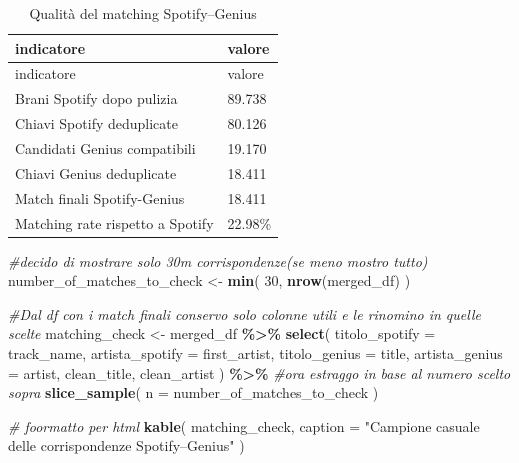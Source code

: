 \documentclass[
]{article}
\newenvironment{Shaded}{\begin{snugshade}}{\end{snugshade}}
\newcommand{\AttributeTok}[1]{\textcolor[rgb]{0.13,0.29,0.53}{#1}}
\newcommand{\CommentTok}[1]{\textcolor[rgb]{0.56,0.35,0.01}{\textit{#1}}}
\newcommand{\DecValTok}[1]{\textcolor[rgb]{0.00,0.00,0.81}{#1}}
\newcommand{\FunctionTok}[1]{\textcolor[rgb]{0.13,0.29,0.53}{\textbf{#1}}}
\newcommand{\NormalTok}[1]{#1}
\newcommand{\OtherTok}[1]{\textcolor[rgb]{0.56,0.35,0.01}{#1}}
\newcommand{\SpecialCharTok}[1]{\textcolor[rgb]{0.81,0.36,0.00}{\textbf{#1}}}
\newcommand{\StringTok}[1]{\textcolor[rgb]{0.31,0.60,0.02}{#1}}
\begin{document}
\begin{longtable}[]{@{}ll@{}}
\caption{Qualità del matching Spotify--Genius}\tabularnewline
\toprule\noalign{}
indicatore & valore \\
\midrule\noalign{}
\endfirsthead
\toprule\noalign{}
indicatore & valore \\
\midrule\noalign{}
\endhead
\bottomrule\noalign{}
\endlastfoot
Brani Spotify dopo pulizia & 89.738 \\
Chiavi Spotify deduplicate & 80.126 \\
Candidati Genius compatibili & 19.170 \\
Chiavi Genius deduplicate & 18.411 \\
Match finali Spotify-Genius & 18.411 \\
Matching rate rispetto a Spotify & 22.98\% \\
\end{longtable}

\begin{Shaded}
\begin{Highlighting}[]
\CommentTok{\#decido di mostrare solo 30m corrispondenze(se meno mostro tutto)}
\NormalTok{number\_of\_matches\_to\_check }\OtherTok{\textless{}{-}} \FunctionTok{min}\NormalTok{(}
  \DecValTok{30}\NormalTok{,}
  \FunctionTok{nrow}\NormalTok{(merged\_df)}
\NormalTok{)}

\CommentTok{\#Dal df con i match finali conservo solo colonne utili e le rinomino in quelle scelte}
\NormalTok{matching\_check }\OtherTok{\textless{}{-}}\NormalTok{ merged\_df }\SpecialCharTok{\%\textgreater{}\%}
  \FunctionTok{select}\NormalTok{(}
    \AttributeTok{titolo\_spotify =}\NormalTok{ track\_name,}
    \AttributeTok{artista\_spotify =}\NormalTok{ first\_artist,}
    \AttributeTok{titolo\_genius =}\NormalTok{ title,}
    \AttributeTok{artista\_genius =}\NormalTok{ artist,}
\NormalTok{    clean\_title,}
\NormalTok{    clean\_artist}
\NormalTok{  ) }\SpecialCharTok{\%\textgreater{}\%}
  \CommentTok{\#ora estraggo in base al numero scelto sopra}
  \FunctionTok{slice\_sample}\NormalTok{(}
    \AttributeTok{n =}\NormalTok{ number\_of\_matches\_to\_check}
\NormalTok{  )}

\CommentTok{\# foormatto per html}
\FunctionTok{kable}\NormalTok{(}
\NormalTok{  matching\_check,}
  \AttributeTok{caption =} \StringTok{"Campione casuale delle corrispondenze Spotify–Genius"}
\NormalTok{)}
\end{Highlighting}
\end{Shaded}
\end{document}
